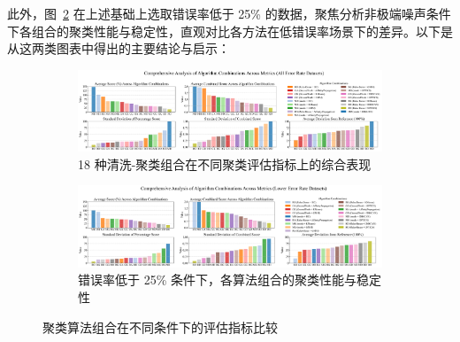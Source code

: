 \documentclass[10pt]{article} %
\numberwithin{equation}{section}
\begin{document}
此外，图~\ref{fig:alg_comb_metrics_low} 在上述基础上选取错误率低于 25\% 的数据，聚焦分析非极端噪声条件下各组合的聚类性能与稳定性，直观对比各方法在低错误率场景下的差异。以下是从这两类图表中得出的主要结论与启示：

\begin{figure}[htbp]
    \centering
    \setlength{\abovecaptionskip}{5pt}  %
    \setlength{\belowcaptionskip}{5pt}  %

    \begin{subfigure}{1.0\linewidth}  %
        \centering
        \includegraphics[width=\linewidth]{figures/alg_comb_metrics.png}
        \caption{18 种清洗-聚类组合在不同聚类评估指标上的综合表现}
        \label{fig:alg_comb_metrics}
    \end{subfigure}

    \vspace{1em}  %

    \begin{subfigure}{1.0\linewidth}  %
        \centering
        \includegraphics[width=\linewidth]{figures/alg_comb_metrics_low.png}
        \caption{错误率低于 25\% 条件下，各算法组合的聚类性能与稳定性}
        \label{fig:alg_comb_metrics_low}
    \end{subfigure}

    \caption{聚类算法组合在不同条件下的评估指标比较}
    \label{fig:alg_comb_metrics_comparison}
\end{figure}
\vspace{-10pt}
\end{document}
